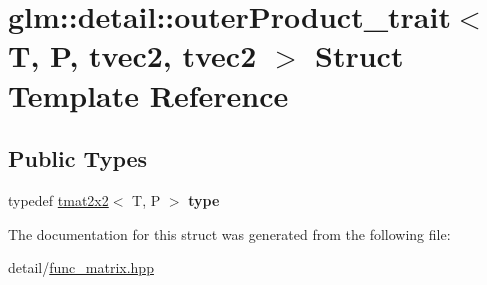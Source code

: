 \hypertarget{structglm_1_1detail_1_1outerProduct__trait_3_01T_00_01P_00_01tvec2_00_01tvec2_01_4}{\section{glm\-:\-:detail\-:\-:outer\-Product\-\_\-trait$<$ T, P, tvec2, tvec2 $>$ Struct Template Reference}
\label{structglm_1_1detail_1_1outerProduct__trait_3_01T_00_01P_00_01tvec2_00_01tvec2_01_4}
}
\subsection*{Public Types}
\begin{DoxyCompactItemize}
\item 
\hypertarget{structglm_1_1detail_1_1outerProduct__trait_3_01T_00_01P_00_01tvec2_00_01tvec2_01_4_a390fb582fa7caa73e53f69181b3b334e}{typedef \hyperlink{structglm_1_1tmat2x2}{tmat2x2}$<$ T, P $>$ {\bfseries type}}\label{structglm_1_1detail_1_1outerProduct__trait_3_01T_00_01P_00_01tvec2_00_01tvec2_01_4_a390fb582fa7caa73e53f69181b3b334e}

\end{DoxyCompactItemize}


The documentation for this struct was generated from the following file\-:\begin{DoxyCompactItemize}
\item 
detail/\hyperlink{func__matrix_8hpp}{func\-\_\-matrix.\-hpp}\end{DoxyCompactItemize}
